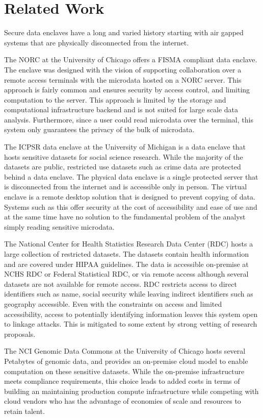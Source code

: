 \section{Related Work}

Secure data enclaves have a long and varied history starting with air gapped systems that are physically
disconnected from the internet.


The NORC \cite{lane2008using} at the University of Chicago offers a FISMA compliant data enclave. The enclave
was designed with the vision of supporting collaboration over a remote access terminals with the microdata hosted
on a NORC server. This approach is fairly common and ensures security by access control, and limiting computation
to the server. This approach is limited by the storage and computational infrastructure backend and is not
suited for large scale data analysis. Furthermore, since a user could read microdata over the terminal, this
system only guarantees the privacy of the bulk of microdata.

The ICPSR data enclave \cite{icpsr} at the University of Michigan is a data enclave that hosts sensitive datasets
for social science research. While the majority of the datasets are public, restricted use datasets such as crime
data are protected behind a data enclave. The physical data enclave is a single protected server that is disconnected
from the internet and is accessible only in person. The virtual enclave is a remote desktop solution that is designed
to prevent copying of data. Systems such as this offer security at the cost of accessibility and ease of use and at
the same time have no solution to the fundamental problem of the analyst simply reading sensitive microdata.

The National Center for Health Statistics Research Data Center (RDC) \cite{cdc} hosts a large collection of
restricted datasets. The datasets contain health information and are covered under HIPAA guidelines.
The data is accessible on-premise at NCHS RDC or Federal Statistical RDC, or via remote access although
several datasets are not available for remote access. RDC restricts access to direct identifiers such as name,
social security while leaving indirect identifiers such as geography accessible. Even with the constraints
on access and limited accessibility, access to potentially identifying information leaves this system open to
linkage attacks. This is mitigated to some extent by strong vetting of research proposals.

The NCI Genomic Data Commons \cite{grossman2016toward} at the University of Chicago hosts several Petabytes of
genomic data, and provides an on-premise cloud model to enable computation on these sensitive datasets.
While the on-premise infrastructure meets compliance requirements, this choice leads to added costs in terms of
building an maintaining production compute infrastructure while competing with cloud vendors who has the advantage
of economies of scale and resources to retain talent.





